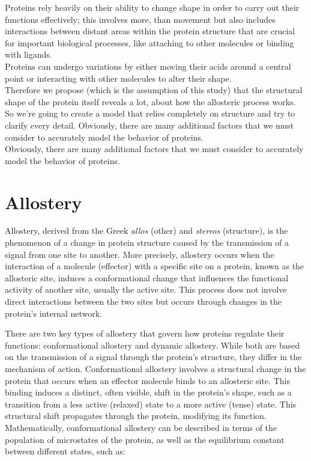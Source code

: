 \documentclass[English, Lau, oneside]{sapthesis}
\begin{document}
Proteins rely heavily on their ability to change shape in order to carry out their functions effectively; this involves more, than movement but also includes interactions between distant areas within the protein structure that are crucial for important biological processes, like attaching to other molecules or binding with ligands.\\ 
Proteins can undergo variations by either moving their acids around a central point or interacting with other molecules to alter their shape. \\
Therefore we propose (which is the assumption of this study) that the structural shape of the protein itself reveals a lot, about how the allosteric process works.\\
So we're going to create a model that relies completely on structure and try to clarify every detail.  Obviously, there are many additional factors that we must consider to accurately model the behavior of proteins.\\
Obviously, there are many additional factors that we must consider to accurately model the behavior of proteins.\\

\newpage
\section{Allostery}
\noindent Allostery, derived from the Greek \textit{allos} (other) and \textit{stereos} (structure), is the phenomenon of a change in protein structure caused by the transmission of a signal from one site to another.\cite{ref5}  
More precisely, allostery occurs when the interaction of a molecule (effector) with a specific site on a protein, known as the allosteric site, induces a conformational change that influences the functional activity of another site, usually the active site.
This process does not involve direct interactions between the two sites but occurs through changes in the protein’s internal network.

There are two key types of allostery that govern how proteins regulate their functions: conformational allostery and dynamic allostery. 
While both are based on the transmission of a signal through the protein’s structure, they differ in the mechanism of action.
Conformational allostery involves a structural change in the protein that occurs when an effector molecule binds to an allosteric site. This binding induces a distinct, often visible, shift in the protein’s shape, such as a transition from a less active (relaxed) state to a more active (tense) state. 
This structural shift propagates through the protein, modifying its function.
Mathematically, conformational allostery can be described in terms of the population of microstates of the protein, as well as the equilibrium constant between different states, such as:
\end{document}
